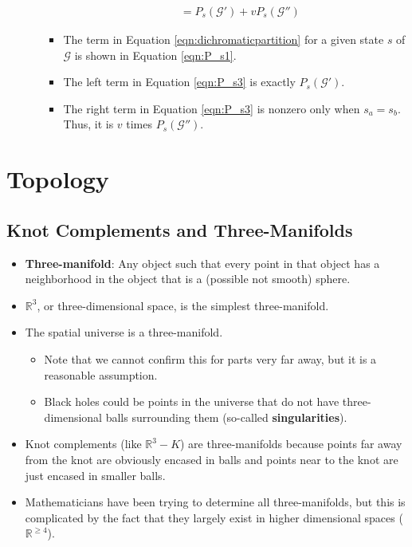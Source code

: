 \documentclass[titlepage]{article}
\numberwithin{figure}{section}
\numberwithin{table}{section}
\numberwithin{equation}{section}
\begin{document}
\begin{itemize}
\begin{itemize}
\begin{itemize}
\begin{align*}
                &= P_s(\mathcal{G}')+vP_s(\mathcal{G}'')
            \end{align*}
            \item The term in Equation \ref{eqn:dichromaticpartition} for a given state $s$ of $\mathcal{G}$ is shown in Equation \ref{eqn:P_s1}.
            \item The left term in Equation \ref{eqn:P_s3} is exactly $P_s(\mathcal{G}')$.
            \item The right term in Equation \ref{eqn:P_s3} is nonzero only when $s_a=s_b$. Thus, it is $v$ times $P_s(\mathcal{G}'')$.
        \end{itemize}
    \end{itemize}
\end{itemize}
\newpage



\section{Topology}
\subsection{Knot Complements and Three-Manifolds}
\begin{itemize}
    \item \textbf{Three-manifold}: Any object such that every point in that object has a neighborhood in the object that is a (possible not smooth) sphere.
    \item $\mathbb{R}^3$, or three-dimensional space, is the simplest three-manifold.
    \item The spatial universe is a three-manifold.
    \begin{itemize}
        \item Note that we cannot confirm this for parts very far away, but it is a reasonable assumption.
        \item Black holes could be points in the universe that do not have three-dimensional balls surrounding them (so-called \textbf{singularities}).
    \end{itemize}
    \item Knot complements (like $\mathbb{R}^3-K$) are three-manifolds because points far away from the knot are obviously encased in balls and points near to the knot are just encased in smaller balls.
    \item Mathematicians have been trying to determine all three-manifolds, but this is complicated by the fact that they largely exist in higher dimensional spaces ($\mathbb{R}^{\geq 4}$).
\end{itemize}
\end{document}

